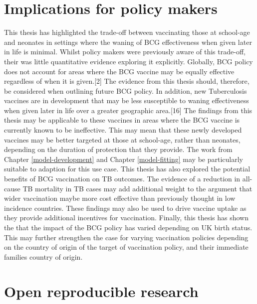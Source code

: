 \documentclass[11pt,twoside]{bristolthesis}
\begin{document}
  \hypertarget{implications-for-policy-makers}{%
  \section{Implications for policy makers}\label{implications-for-policy-makers}}
  
  This thesis has highlighted the trade-off between vaccinating those at school-age and neonates in settings where the waning of BCG effectiveness when given later in life is minimal. Whilst policy makers were previously aware of this trade-off, their was little quantitative evidence exploring it explicitly. Globally, BCG policy does not account for areas where the BCG vaccine may be equally effective regardless of when it is given.{[}2{]} The evidence from this thesis should, therefore, be considered when outlining future BCG policy. In addition, new Tuberculosis vaccines are in development that may be less susceptible to waning effectiveness when given later in life over a greater geographic area.{[}16{]} The findings from this thesis may be applicable to these vaccines in areas where the BCG vaccine is currently known to be ineffective. This may mean that these newly developed vaccines may be better targeted at those at school-age, rather than neonates, depending on the duration of protection that they provide. The work from Chapter \ref{model-development} and Chapter \ref{model-fitting} may be particularly suitable to adaption for this use case. This thesis has also explored the potential benefits of BCG vaccination on TB outcomes. The evidence of a reduction in all-cause TB mortality in TB cases may add additional weight to the argument that wider vaccination maybe more cost effective than previously thought in low incidence countries. These findings may also be used to drive vaccine uptake as they provide additional incentives for vaccination. Finally, this thesis has shown the that the impact of the BCG policy has varied depending on UK birth status. This may further strengthen the case for varying vaccination policies depending on the country of origin of the target of vaccination policy, and their immediate families country of origin.
  
  \hypertarget{open-reproducible-research}{%
  \section{Open reproducible research}\label{open-reproducible-research}}
  
\end{document}
